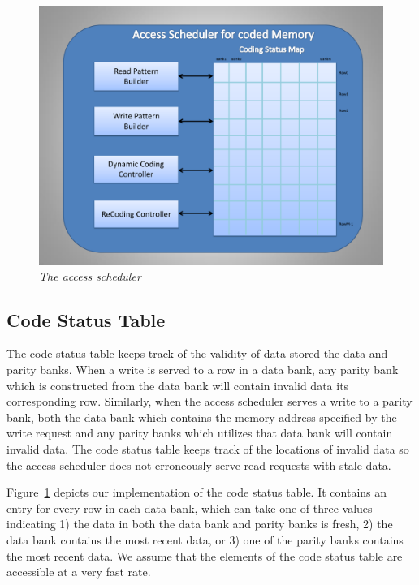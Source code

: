 \begin{figure}[tbp]
\centering
\includegraphics[width=0.7\linewidth]{fig/coded_access_scheduler.pdf}
\caption{
{\it{The access scheduler} }}
\label{fig:coded_access_scheduler}
\end{figure}
\subsection{Code Status Table}
\label{sec:codeStatusTable}
The code status table keeps track of the validity of data stored the data and parity banks. When a write is served to a row in a data bank, any parity bank which is constructed from the data bank will contain invalid data its corresponding row. Similarly, when the access scheduler serves a write to a parity bank, both the data bank which contains the memory address specified by the write request and any parity banks which utilizes that data bank will contain invalid data. The code status table keeps track of the locations of invalid data so the access scheduler does not erroneously serve read requests with stale data.

Figure~\ref{fig:coded_access_scheduler} depicts our implementation of the code status table. It contains an entry for every row in each data bank, which can take one of three values indicating 1) the data in both the data bank and parity banks is fresh, 2) the data bank contains the most recent data, or 3) one of the parity banks contains the most recent data. 
We assume that the elements of the code status table are accessible at a very fast rate. 


